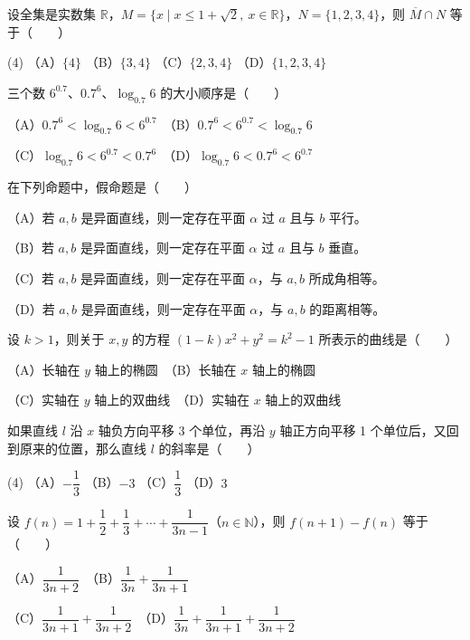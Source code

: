 \begin{question}
设全集是实数集 $\mathbb R$，$M=\{x\mid x\le 1+\sqrt2,\ x\in\mathbb R\}$，$N=\{1,2,3,4\}$，则 $\overline M\cap N$ 等于\mbox{（　　）}

\begin{gkopts}(4)
\task （A）$\{4\}$
\task （B）$\{3,4\}$
\task （C）$\{2,3,4\}$
\task （D）$\{1,2,3,4\}$
\end{gkopts}

\end{question}
\begin{question}
三个数 $6^{0.7}$、$0.7^6$、$\log_{0.7}6$ 的大小顺序是\mbox{（　　）}

（A）$0.7^6<\log_{0.7}6<6^{0.7}$　（B）$0.7^6<6^{0.7}<\log_{0.7}6$

（C）$\log_{0.7}6<6^{0.7}<0.7^6$　（D）$\log_{0.7}6<0.7^6<6^{0.7}$

\end{question}
\begin{question}
在下列命题中，假命题是\mbox{（　　）}

（A）若 $a,b$ 是异面直线，则一定存在平面 $\alpha$ 过 $a$ 且与 $b$ 平行。

（B）若 $a,b$ 是异面直线，则一定存在平面 $\alpha$ 过 $a$ 且与 $b$ 垂直。

（C）若 $a,b$ 是异面直线，则一定存在平面 $\alpha$，与 $a,b$ 所成角相等。

（D）若 $a,b$ 是异面直线，则一定存在平面 $\alpha$，与 $a,b$ 的距离相等。

\end{question}
\begin{question}
设 $k>1$，则关于 $x,y$ 的方程 $(1-k)x^2+y^2=k^2-1$ 所表示的曲线是\mbox{（　　）}

（A）长轴在 $y$ 轴上的椭圆　（B）长轴在 $x$ 轴上的椭圆

（C）实轴在 $y$ 轴上的双曲线　（D）实轴在 $x$ 轴上的双曲线

\end{question}
\begin{question}
如果直线 $l$ 沿 $x$ 轴负方向平移 3 个单位，再沿 $y$ 轴正方向平移 1 个单位后，又回到原来的位置，那么直线 $l$ 的斜率是\mbox{（　　）}

\begin{gkopts}(4)
\task （A）$-\dfrac13$
\task （B）$-3$
\task （C）$\dfrac13$
\task （D）$3$
\end{gkopts}

\end{question}
\begin{question}
设 $f(n)=1+\dfrac12+\dfrac13+\cdots+\dfrac1{3n-1}$（$n\in\mathbb N$），则 $f(n+1)-f(n)$ 等于\mbox{（　　）}

（A）$\dfrac1{3n+2}$　（B）$\dfrac1{3n}+\dfrac1{3n+1}$

（C）$\dfrac1{3n+1}+\dfrac1{3n+2}$　（D）$\dfrac1{3n}+\dfrac1{3n+1}+\dfrac1{3n+2}$

\end{question}

